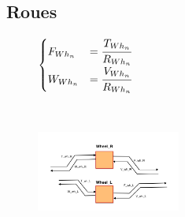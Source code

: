 \subsection{Roues}
\vspace{-20px}
\begin{figure}[ht]
\centering
\begin{minipage}{.5\textwidth}  
\centering
$\begin{cases}
	F_{Wh_n} &= \cfrac{T_{Wh_n}}{R_{Wh_n}}  \\
	W_{Wh_n} &= \cfrac{V_{Wh_n}}{R_{Wh_n}}
\end{cases}$
\end{minipage}~
\begin{minipage}{.5\textwidth}
  \centering
\includegraphics[height=100px]{images/Wheel.png}
\end{minipage}
\end{figure}
\FloatBarrier
\vspace{-30px}

\newpage
